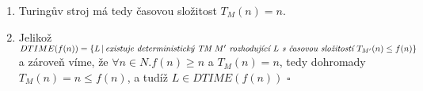 \documentclass[a4paper]{article}
\begin{document}
\begin{enumerate}
    \item Turingův stroj má tedy časovou složitost $T_M(n)=n$. %
    \item Jelikož $DTIME(f(n)) = \{L\,|\, \emph{existuje deterministický TM }M' \emph{ rozhodující }L\emph{ s~časovou složitostí } T_{M'}(n) \leq f(n)\}$ a zároveň
    víme, že $\forall n \in N.f(n) \geq n$ a $T_M(n)=n$, tedy dohromady $T_M(n)=n \leq f(n)$, a tudíž $L\in DTIME(f(n))$ $\square$
\end{enumerate}
\end{document}
